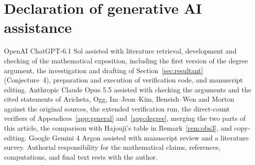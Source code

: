 \documentclass[11pt,a4paper]{article}
\theoremstyle{remark}\newtheorem{remark}[theorem]{Remark}
\numberwithin{equation}{section}
\begin{document}
	\section*{Declaration of generative AI assistance}
	OpenAI ChatGPT-6.1 Sol assisted with literature retrieval, development and checking of the mathematical exposition, including the first version of the degree argument, the investigation and drafting of Section~\ref{sec:resultant} (Conjecture~4), preparation and execution of verification code, and manuscript editing. Anthropic Claude Opus 5.5 assisted with checking the arguments and the cited statements of Aricheta, Ogg, Im--Jeon--Kim, Beneish--Wen and Morton against the original sources, the extended verification run, the direct-count verifiers of Appendices~\ref{app:general} and~\ref{app:degree}, merging the two parts of this article, the comparison with Hajouji's table in Remark~\ref{rem:obs3}, and copy-editing. Google Gemini 4 Argon assisted with manuscript review and a literature survey. Authorial responsibility for the mathematical claims, references, computations, and final text rests with the author.
	
\end{document}
